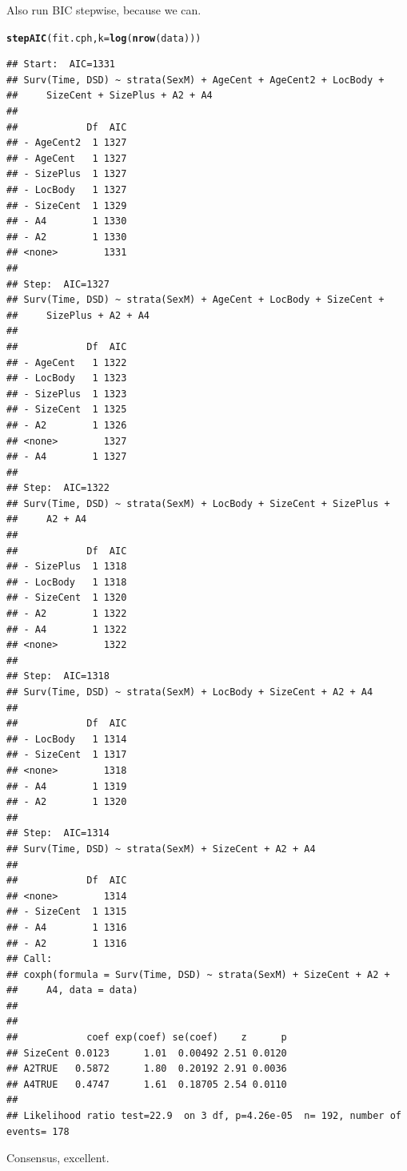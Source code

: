 \documentclass{article}\usepackage[]{graphicx}\usepackage[]{color}
\makeatletter
\newcommand{\hlstd}[1]{\textcolor[rgb]{0.345,0.345,0.345}{#1}}%
\newcommand{\hlkwc}[1]{\textcolor[rgb]{0.333,0.667,0.333}{#1}}%
\newcommand{\hlkwd}[1]{\textcolor[rgb]{0.737,0.353,0.396}{\textbf{#1}}}%
\newenvironment{kframe}{%
 \def\at@end@of@kframe{}%
 \ifinner\ifhmode%
  \def\at@end@of@kframe{\end{minipage}}%
  \begin{minipage}{\columnwidth}%
 \fi\fi%
 \def\FrameCommand##1{\hskip\@totalleftmargin \hskip-\fboxsep
 \colorbox{shadecolor}{##1}\hskip-\fboxsep
     \hskip-\linewidth \hskip-\@totalleftmargin \hskip\columnwidth}%
 \MakeFramed {\advance\hsize-\width
   \@totalleftmargin\z@ \linewidth\hsize
   \@setminipage}}%
 {\par\unskip\endMakeFramed%
 \at@end@of@kframe}
\newenvironment{knitrout}{}{} %
\makeatother
\begin{document}
Also run BIC stepwise, because we can.
\begin{knitrout}
\color{fgcolor}\begin{kframe}
\begin{alltt}
\hlkwd{stepAIC}\hlstd{(fit.cph,} \hlkwc{k} \hlstd{=} \hlkwd{log}\hlstd{(}\hlkwd{nrow}\hlstd{(data)))}
\end{alltt}
\begin{verbatim}
## Start:  AIC=1331
## Surv(Time, DSD) ~ strata(SexM) + AgeCent + AgeCent2 + LocBody + 
##     SizeCent + SizePlus + A2 + A4
## 
##            Df  AIC
## - AgeCent2  1 1327
## - AgeCent   1 1327
## - SizePlus  1 1327
## - LocBody   1 1327
## - SizeCent  1 1329
## - A4        1 1330
## - A2        1 1330
## <none>        1331
## 
## Step:  AIC=1327
## Surv(Time, DSD) ~ strata(SexM) + AgeCent + LocBody + SizeCent + 
##     SizePlus + A2 + A4
## 
##            Df  AIC
## - AgeCent   1 1322
## - LocBody   1 1323
## - SizePlus  1 1323
## - SizeCent  1 1325
## - A2        1 1326
## <none>        1327
## - A4        1 1327
## 
## Step:  AIC=1322
## Surv(Time, DSD) ~ strata(SexM) + LocBody + SizeCent + SizePlus + 
##     A2 + A4
## 
##            Df  AIC
## - SizePlus  1 1318
## - LocBody   1 1318
## - SizeCent  1 1320
## - A2        1 1322
## - A4        1 1322
## <none>        1322
## 
## Step:  AIC=1318
## Surv(Time, DSD) ~ strata(SexM) + LocBody + SizeCent + A2 + A4
## 
##            Df  AIC
## - LocBody   1 1314
## - SizeCent  1 1317
## <none>        1318
## - A4        1 1319
## - A2        1 1320
## 
## Step:  AIC=1314
## Surv(Time, DSD) ~ strata(SexM) + SizeCent + A2 + A4
## 
##            Df  AIC
## <none>        1314
## - SizeCent  1 1315
## - A4        1 1316
## - A2        1 1316
## Call:
## coxph(formula = Surv(Time, DSD) ~ strata(SexM) + SizeCent + A2 + 
##     A4, data = data)
## 
## 
##            coef exp(coef) se(coef)    z      p
## SizeCent 0.0123      1.01  0.00492 2.51 0.0120
## A2TRUE   0.5872      1.80  0.20192 2.91 0.0036
## A4TRUE   0.4747      1.61  0.18705 2.54 0.0110
## 
## Likelihood ratio test=22.9  on 3 df, p=4.26e-05  n= 192, number of events= 178
\end{verbatim}
\end{kframe}
\end{knitrout}
Consensus, excellent.
\end{document}
